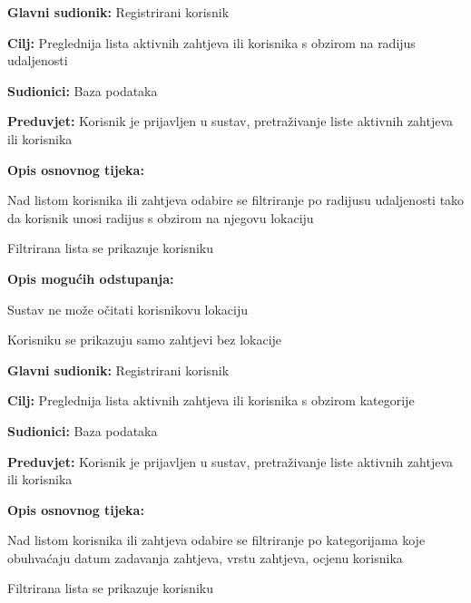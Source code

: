 \noindent {}
\begin{packed_item}
	\item \textbf{Glavni sudionik: } Registrirani korisnik
	\item  \textbf{Cilj:} Preglednija lista aktivnih zahtjeva ili korisnika s obzirom na radijus udaljenosti 
	\item  \textbf{Sudionici:} Baza podataka
	\item  \textbf{Preduvjet:} Korisnik je prijavljen u sustav, pretraživanje liste aktivnih zahtjeva ili korisnika
	\item  \textbf{Opis osnovnog tijeka:}
	\item[] \begin{packed_enum}
		\item Nad listom korisnika ili zahtjeva odabire se filtriranje po radijusu udaljenosti tako da korisnik unosi radijus s obzirom na njegovu lokaciju
		\item Filtrirana lista se prikazuje korisniku
	\end{packed_enum}
	\item  \textbf{Opis mogućih odstupanja:}
	\item[] \begin{packed_item}
		\item[1.a] 	Sustav ne može očitati korisnikovu lokaciju
		\item[] \begin{packed_enum}
			\item Korisniku se prikazuju samo zahtjevi bez lokacije
		\end{packed_enum}
	\end{packed_item}
\end{packed_item}

\noindent {}
\begin{packed_item}
	\item \textbf{Glavni sudionik: } Registrirani korisnik
	\item  \textbf{Cilj:} Preglednija lista aktivnih zahtjeva ili korisnika s obzirom kategorije 
	\item  \textbf{Sudionici:} Baza podataka
	\item  \textbf{Preduvjet:} Korisnik je prijavljen u sustav, pretraživanje liste aktivnih zahtjeva ili korisnika
	\item  \textbf{Opis osnovnog tijeka:}
	\item[] \begin{packed_enum}
		\item Nad listom korisnika ili zahtjeva odabire se filtriranje po kategorijama koje obuhvaćaju datum zadavanja zahtjeva, vrstu zahtjeva, ocjenu korisnika
		\item Filtrirana lista se prikazuje korisniku
	\end{packed_enum}
\end{packed_item}

